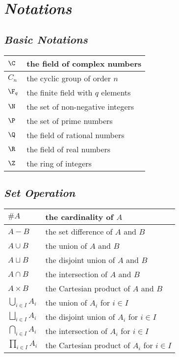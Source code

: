\chapter*{\emph{Notations}}

\def\arraystretch{1}


\section*{\emph{Basic Notations}}

\begin{longtable}{ll}
    \hline
    $\C$ & the field of complex numbers \\ \hline
    $C_n$ & the cyclic group of order $n$ \\ \hline
    $\F_q$ & the finite field with $q$ elements \\ \hline
    $\N$ & the set of non-negative integers \\ \hline
    $\P$ & the set of prime numbers \\ \hline
    $\Q$ & the field of rational numbers \\ \hline
    $\R$ & the field of real numbers \\ \hline
    $\Z$ & the ring of integers \\ \hline
\end{longtable}


\section*{\emph{Set Operation}}

\begin{longtable}{ll}
    \hline
    $\#A$ & the cardinality of $A$ \\ \hline
    $A-B$ & the set difference of $A$ and $B$ \\ \hline
    $A\cup B$ & the union of $A$ and $B$ \\ \hline
    $A\sqcup B$ & the disjoint union of $A$ and $B$ \\ \hline
    $A\cap B$ & the intersection of $A$ and $B$ \\ \hline
    $A\times B$ & the Cartesian product of $A$ and $B$ \\ \hline
    $\bigcup_{i\in I}{A_i}$ & the union of $A_i$ for $i\in I$ \\ \hline
    $\bigsqcup_{i\in I}{A_i}$ & the disjoint union of $A_i$ for $i\in I$ \\ \hline
    $\bigcap_{i\in I}{A_i}$ & the intersection of $A_i$ for $i\in I$ \\ \hline
    $\prod_{i\in I}{A_i}$ & the Cartesian product of $A_i$ for $i\in I$ \\ \hline
\end{longtable}

